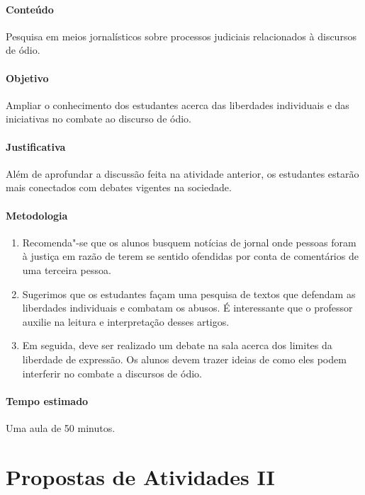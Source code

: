 \documentclass[12pt]{extarticle}
\begin{document}
\paragraph{Conteúdo} Pesquisa em meios jornalísticos sobre processos judiciais
relacionados à discursos de ódio.

\paragraph{Objetivo} Ampliar o conhecimento dos estudantes
acerca das liberdades individuais e das iniciativas no combate ao discurso de ódio.

\paragraph{Justificativa} Além de aprofundar a discussão feita
na atividade anterior, os estudantes estarão mais conectados com debates
vigentes na sociedade.

\paragraph{Metodologia} 

\begin{enumerate}

\item Recomenda"-se que os alunos busquem notícias de jornal onde pessoas foram
à justiça em razão de terem se sentido ofendidas por conta de
comentários de uma terceira pessoa.

\item Sugerimos que os estudantes façam uma pesquisa de 
textos que defendam as liberdades individuais e
combatam os abusos. É interessante que o professor auxilie
 na leitura e interpretação desses artigos.
 
\item Em seguida, deve ser realizado um
debate na sala acerca dos limites da liberdade de expressão.
Os alunos devem trazer ideias de como eles
podem interferir no combate a discursos de ódio.

\end{enumerate}

\paragraph{Tempo estimado} Uma aula de 50 minutos.


\section{Propostas de Atividades II}
\end{document}
